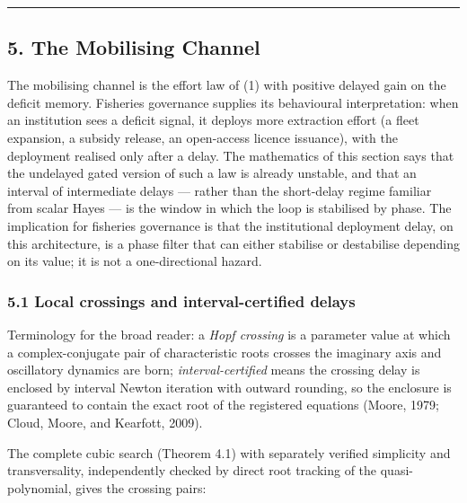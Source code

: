 \documentclass[11pt]{article}
\begin{document}
\begin{center}\rule{0.5\linewidth}{0.5pt}\end{center}

\subsection{5. The Mobilising Channel}\label{the-mobilising-channel}

The mobilising channel is the effort law of (1) with positive delayed
gain on the deficit memory. Fisheries governance supplies its
behavioural interpretation: when an institution sees a deficit signal,
it deploys more extraction effort (a fleet expansion, a subsidy release,
an open-access licence issuance), with the deployment realised only
after a delay. The mathematics of this section says that the undelayed
gated version of such a law is already unstable, and that an interval of
intermediate delays --- rather than the short-delay regime familiar from
scalar Hayes --- is the window in which the loop is stabilised by phase.
The implication for fisheries governance is that the institutional
deployment delay, on this architecture, is a phase filter that can
either stabilise or destabilise depending on its value; it is not a
one-directional hazard.

\subsubsection{5.1 Local crossings and interval-certified
delays}\label{local-crossings-and-interval-certified-delays}

Terminology for the broad reader: a \emph{Hopf crossing} is a parameter
value at which a complex-conjugate pair of characteristic roots crosses
the imaginary axis and oscillatory dynamics are born;
\emph{interval-certified} means the crossing delay is enclosed by
interval Newton iteration with outward rounding, so the enclosure is
guaranteed to contain the exact root of the registered equations (Moore,
1979; Cloud, Moore, and Kearfott, 2009).

The complete cubic search (Theorem 4.1) with separately verified
simplicity and transversality, independently checked by direct root
tracking of the quasi-polynomial, gives the crossing pairs:
\end{document}
